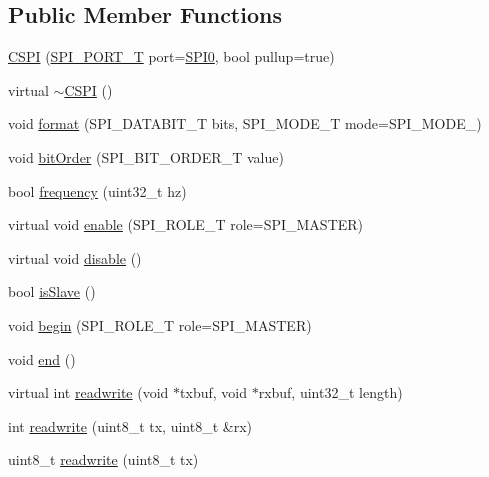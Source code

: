 \subsection*{Public Member Functions}
\begin{DoxyCompactItemize}
\item 
\hyperlink{class_c_s_p_i_a45ebc1852b74f5f0ccfbb97b302cf5e9}{C\-S\-P\-I} (\hyperlink{group___enumerations_ga1adbe6bf70e3880dc6b9f86e58bb7f98}{S\-P\-I\-\_\-\-P\-O\-R\-T\-\_\-\-T} port=\hyperlink{group___enumerations_gga1adbe6bf70e3880dc6b9f86e58bb7f98a7add1e0588a075d9385b10fcbb2010f4}{S\-P\-I0}, bool pullup=true)
\item 
virtual \hyperlink{class_c_s_p_i_ade8c01d1d751682ededa1cb27ab85409}{$\sim$\-C\-S\-P\-I} ()
\item 
void \hyperlink{class_c_s_p_i_accc9a5c831ee85e95f0bb5567de5f529}{format} (S\-P\-I\-\_\-\-D\-A\-T\-A\-B\-I\-T\-\_\-\-T bits, S\-P\-I\-\_\-\-M\-O\-D\-E\-\_\-\-T mode=S\-P\-I\-\_\-\-M\-O\-D\-E\-\_)
\item 
void \hyperlink{class_c_s_p_i_aa7a160dad74689b9afb720c78d63558f}{bit\-Order} (S\-P\-I\-\_\-\-B\-I\-T\-\_\-\-O\-R\-D\-E\-R\-\_\-\-T value)
\item 
bool \hyperlink{class_c_s_p_i_ad8143fa5be48bc62762fda52b86d630a}{frequency} (uint32\-\_\-t hz)
\item 
virtual void \hyperlink{class_c_s_p_i_a7dc9ce9f0b38a59f7332e6f4f39864e8}{enable} (S\-P\-I\-\_\-\-R\-O\-L\-E\-\_\-\-T role=S\-P\-I\-\_\-\-M\-A\-S\-T\-E\-R)
\item 
virtual void \hyperlink{class_c_s_p_i_a5009ac7cc08bcf2b1d1be19b320424e6}{disable} ()
\item 
bool \hyperlink{class_c_s_p_i_ab237c0acc917287a8f7cdca7e91e87c6}{is\-Slave} ()
\item 
void \hyperlink{class_c_s_p_i_a98fb4712f52c9977d4973430f5f505b8}{begin} (S\-P\-I\-\_\-\-R\-O\-L\-E\-\_\-\-T role=S\-P\-I\-\_\-\-M\-A\-S\-T\-E\-R)
\item 
void \hyperlink{class_c_s_p_i_a9a8f9843e54bf4f11dd871cf798fe337}{end} ()
\item 
virtual int \hyperlink{class_c_s_p_i_a5215a320db4cb5f2792ea18f8d6e0671}{readwrite} (void $\ast$txbuf, void $\ast$rxbuf, uint32\-\_\-t length)
\item 
int \hyperlink{class_c_s_p_i_a0cdfe6a4d42e835cf7b67ba99ae115ca}{readwrite} (uint8\-\_\-t tx, uint8\-\_\-t \&rx)
\item 
uint8\-\_\-t \hyperlink{class_c_s_p_i_acf2e1695f717fa88620e4bddd7871ea3}{readwrite} (uint8\-\_\-t tx)

\end{DoxyCompactItemize}
